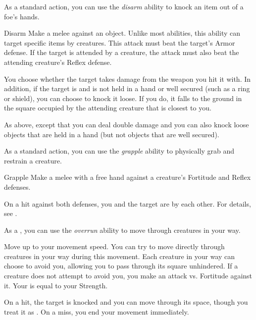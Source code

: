          As a standard action, you can use the \textit{disarm} ability to knock an item out of a foe's hands.

        \begin{freeability}{Disarm}\label{Disarm}
            Make a melee  against an object.
            Unlike most abilities, this ability can target specific items  by creatures.
            This attack must beat the target's Armor defense.
            If the target is attended by a creature, the attack must also beat the attending creature's Reflex defense.

            \hit You choose whether the target takes damage from the weapon you hit it with.
            In addition, if the target is  and is not held in a hand or well secured (such as a ring or shield), you can choose to knock it loose.
            If you do, it falls to the ground in the square occupied by the attending creature that is closest to you.

            \crit As above, except that you can deal double damage and you can also knock loose objects that are held in a hand (but not objects that are well secured).
        \end{freeability}

         As a standard action, you can use the \textit{grapple} ability to physically grab and restrain a creature.

        \begin{freeability}{Grapple}\label{Grapple}
            Make a melee  with a free hand against a creature's Fortitude and Reflex defenses.

            On a hit against both defenses, you and the target are \grappled by each other.
            For details, see .
        \end{freeability}

         As a , you can use the \textit{overrun} ability to move through creatures in your way.

        \begin{freeability}{}
            Move up to your movement speed.
            You can try to move directly through creatures in your way during this movement.
            Each creature in your way can choose to avoid you, allowing you to pass through its square unhindered.
            If a creature does not attempt to avoid you, you make an attack vs. Fortitude against it.
            Your  is equal to your Strength.

            On a hit, the target is knocked  and you can move through its space, though you treat it as .
            On a miss, you end your movement immediately.
        \end{freeability}

